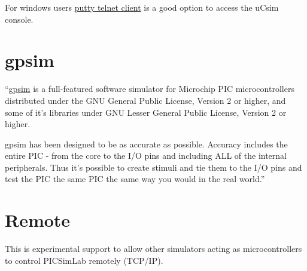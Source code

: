 For windows users \href{https://www.putty.org/}{putty telnet client} is a good option to access the uCsim console. 
 
  
\section{gpsim} \hypertarget{def:gpsim}{}

``\href{http://gpsim.sourceforge.net/}{gpsim} is a full-featured software simulator for Microchip PIC microcontrollers distributed under the GNU General Public License, Version 2 or higher, and some of it's libraries under GNU Lesser General Public License, Version 2 or higher.

gpsim has been designed to be as accurate as possible. Accuracy includes the entire PIC - from the core to the I/O pins and including ALL of the internal peripherals. Thus it's possible to create stimuli and tie them to the I/O pins and test the PIC the same PIC the same way you would in the real world.'' 
  
  
\section{Remote} \hypertarget{def:remote}{}

This is experimental support to allow other simulators acting as microcontrollers to control PICSimLab remotely (TCP/IP).
